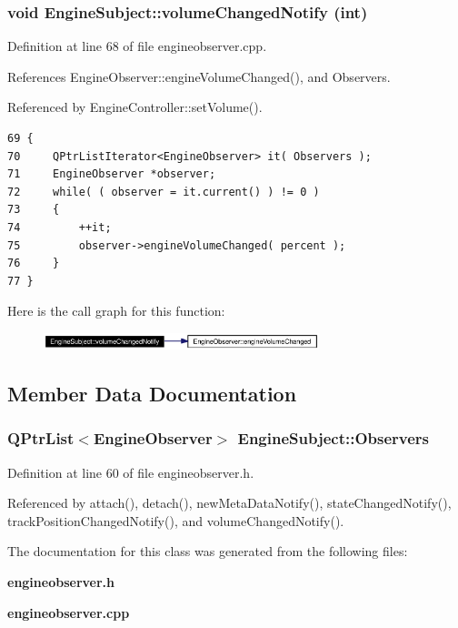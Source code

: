 \subsubsection{\setlength{\rightskip}{0pt plus 5cm}void Engine\-Subject::volume\-Changed\-Notify (int)\hspace{0.3cm}{\tt  [protected]}}\label{classEngineSubject_EngineSubjectb4}




Definition at line 68 of file engineobserver.cpp.

References Engine\-Observer::engine\-Volume\-Changed(), and Observers.

Referenced by Engine\-Controller::set\-Volume().



\footnotesize\begin{verbatim}69 {
70     QPtrListIterator<EngineObserver> it( Observers );
71     EngineObserver *observer;
72     while( ( observer = it.current() ) != 0 )
73     {
74         ++it;
75         observer->engineVolumeChanged( percent );
76     }
77 }
\end{verbatim}\normalsize 


Here is the call graph for this function:\begin{figure}[H]
\begin{center}
\leavevmode
\includegraphics[width=227pt]{classEngineSubject_EngineSubjectb4_cgraph}
\end{center}
\end{figure}


\subsection{Member Data Documentation}
\subsubsection{\setlength{\rightskip}{0pt plus 5cm}QPtr\-List$<${\bf Engine\-Observer}$>$ {\bf Engine\-Subject::Observers}\hspace{0.3cm}{\tt  [private]}}\label{classEngineSubject_EngineSubjectr0}




Definition at line 60 of file engineobserver.h.

Referenced by attach(), detach(), new\-Meta\-Data\-Notify(), state\-Changed\-Notify(), track\-Position\-Changed\-Notify(), and volume\-Changed\-Notify().

The documentation for this class was generated from the following files:\begin{CompactItemize}
\item 
{\bf engineobserver.h}\item 
{\bf engineobserver.cpp}\end{CompactItemize}
